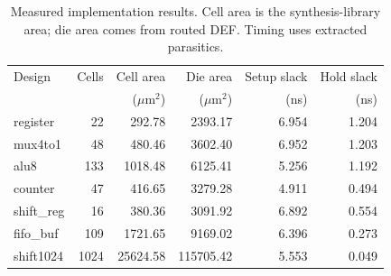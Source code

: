 \begin{table}[htbp]\centering\small\setlength{\tabcolsep}{4pt}
\caption{Measured implementation results. Cell area is the synthesis-library area; die area comes from routed DEF. Timing uses extracted parasitics.}\label{tab:qor}
\begin{tabular}{@{}lrrrrr@{}}\toprule
Design & Cells & Cell area & Die area & Setup slack & Hold slack \\
 & & ($\mu$m$^2$) & ($\mu$m$^2$) & (ns) & (ns) \\
\midrule
register & 22 & 292.78 & 2393.17 & 6.954 & 1.204 \\
mux4to1 & 48 & 480.46 & 3602.40 & 6.952 & 1.203 \\
alu8 & 133 & 1018.48 & 6125.41 & 5.256 & 1.192 \\
counter & 47 & 416.65 & 3279.28 & 4.911 & 0.494 \\
shift\_reg & 16 & 380.36 & 3091.92 & 6.892 & 0.554 \\
fifo\_buf & 109 & 1721.65 & 9169.02 & 6.396 & 0.273 \\
shift1024 & 1024 & 25624.58 & 115705.42 & 5.553 & 0.049 \\
\bottomrule\end{tabular}\end{table}
